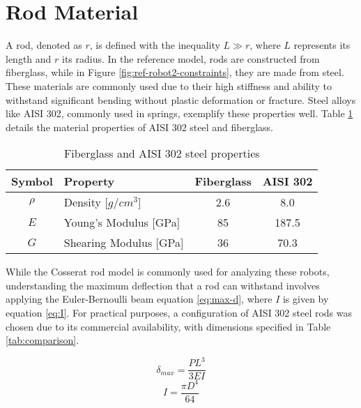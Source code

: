 \section{Rod Material}

A rod, denoted as \( r \), is defined with the inequality \( L \gg r \), where \( L \) represents its length and \( r \) its radius. In the reference model, rods are constructed from fiberglass, while in Figure \ref{fig:ref-robot2-constraints}, they are made from steel. These materials are commonly used due to their high stiffness and ability to withstand  significant bending without plastic deformation or fracture. Steel alloys like AISI 302, commonly used in springs, exemplify these properties well. Table \ref{tab:material-properties} details the material properties of AISI 302 steel and fiberglass.

\begin{table}[h]
    \centering
    \caption{Fiberglass and AISI 302 steel properties}
    \label{tab:material-properties}
    \begin{tabular}{clcc}
    \toprule
    Symbol & Property                   & Fiberglass & AISI 302 \\ \midrule
    $\rho$ & Density [$g/cm^3$]        & 2.6        & 8.0      \\
    $E$    & Young's Modulus [GPa]  & 85         & 187.5    \\
    $G$    & Shearing Modulus [GPa] & 36         & 70.3     \\ \bottomrule
    \end{tabular}
\end{table}


While the Cosserat rod model \cite{russo2023} is commonly used for analyzing these robots, understanding the maximum deflection that a rod can withstand involves applying the Euler-Bernoulli beam equation \ref{eq:max-d}, where \( I \) is given by equation \ref{eq:I}. For practical purposes, a configuration of AISI 302 steel rods was chosen due to its commercial availability, with dimensions specified in Table \ref{tab:comparison}.

\begin{equation}
    \label{eq:max-d}
    \delta_{max}=\frac{PL^3}{3EI}
\end{equation}
\begin{equation}
    \label{eq:I}
    I=\frac{\pi D^4}{64}
\end{equation}

